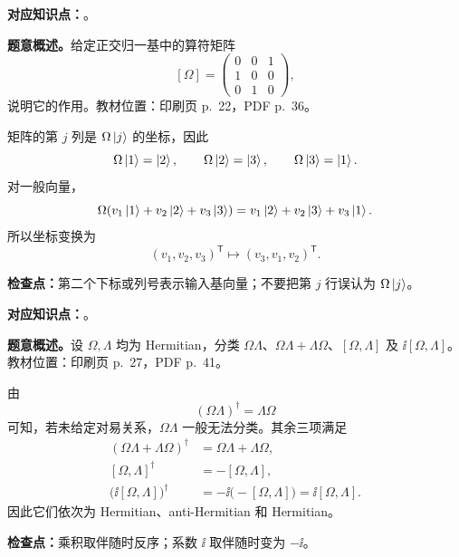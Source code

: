 
\textbf{对应知识点：}。

\textbf{题意概述。}给定正交归一基中的算符矩阵
\[
  [\Omega]=
  \begin{pmatrix}
    0&0&1\\
    1&0&0\\
    0&1&0
  \end{pmatrix},
\]
说明它的作用。教材位置：印刷页 p.~22，PDF p.~36。

\begin{checkedsolution}
矩阵的第 $j$ 列是 $\Omega\left|j\right\rangle$ 的坐标，因此
\[
  \Omega\left|1\right\rangle=\left|2\right\rangle,
  \qquad
  \Omega\left|2\right\rangle=\left|3\right\rangle,
  \qquad
  \Omega\left|3\right\rangle=\left|1\right\rangle.
\]
对一般向量，
\[
  \Omega(v_1\left|1\right\rangle+v_2\left|2\right\rangle+v_3\left|3\right\rangle)
  =v_1\left|2\right\rangle+v_2\left|3\right\rangle+v_3\left|1\right\rangle.
\]
所以坐标变换为
\[
  (v_1,v_2,v_3)^{\mathsf T}
  \longmapsto
  (v_3,v_1,v_2)^{\mathsf T}.
\]
\end{checkedsolution}

\textbf{检查点：}第二个下标或列号表示输入基向量；不要把第 $j$ 行误认为 $\Omega\left|j\right\rangle$。


\textbf{对应知识点：}。

\textbf{题意概述。}设 $\Omega,\Lambda$ 均为 Hermitian，分类 $\Omega\Lambda$、$\Omega\Lambda+\Lambda\Omega$、$[\Omega,\Lambda]$ 及 $\ii[\Omega,\Lambda]$。教材位置：印刷页 p.~27，PDF p.~41。

\begin{checkedsolution}
由
\[
  (\Omega\Lambda)^\dagger=\Lambda\Omega
\]
可知，若未给定对易关系，$\Omega\Lambda$ 一般无法分类。其余三项满足
\begin{align*}
  (\Omega\Lambda+\Lambda\Omega)^\dagger
  &=\Omega\Lambda+\Lambda\Omega,\\
  [\Omega,\Lambda]^\dagger
  &=-[\Omega,\Lambda],\\
  \bigl(\ii[\Omega,\Lambda]\bigr)^\dagger
  &=-\ii\bigl(-[\Omega,\Lambda]\bigr)
   =\ii[\Omega,\Lambda].
\end{align*}
因此它们依次为 Hermitian、anti-Hermitian 和 Hermitian。
\end{checkedsolution}

\textbf{检查点：}乘积取伴随时反序；系数 $\ii$ 取伴随时变为 $-\ii$。


